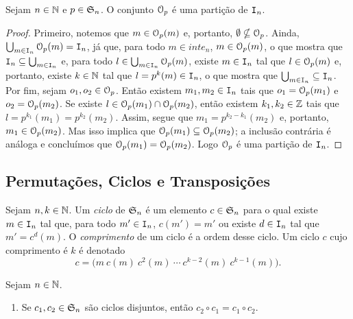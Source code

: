 \begin{prop}
	Sejam $n \in \mathbb{N}$ e $p \in \mathfrak{S}_n$. O conjunto $\mathcal{O}_p$ é uma partição de $\mathtt I_n$.
\end{prop}
\begin{proof}
	Primeiro, notemos que $m \in \mathcal{O}_p(m)$ e, portanto, $\emptyset \nsubseteq \mathcal{O}_p$. Ainda, $\bigcup_{m \in \mathtt I_n} \mathcal{O}_p(m) = \mathtt I_n$, já que, para todo $m \in inte_n$, $m \in \mathcal{O}_p(m)$, o que mostra que $\mathtt I_n \subseteq \bigcup_{m \in \mathtt I_n}$ e, para todo $l \in \bigcup_{m \in \mathtt I_n} \mathcal{O}_p(m)$, existe $m \in \mathtt I_n$ tal que $l \in \mathcal{O}_p(m)$ e, portanto, existe $k \in \mathbb{N}$ tal que $l=p^k(m) \in \mathtt I_n$, o que mostra que $\bigcup_{m \in \mathtt I_n} \subseteq \mathtt I_n$. Por fim, sejam $o_1,o_2 \in \mathcal{O}_p$. Então existem $m_1,m_2 \in \mathtt I_n$ tais que $o_1=\mathcal{O}_p(m_1)$ e $o_2=\mathcal{O}_p(m_2)$. Se existe $l \in \mathcal{O}_p(m_1) \cap \mathcal{O}_p(m_2)$, então existem $k_1,k_2 \in \mathbb{Z}$ tais que $l=p^{k_1}(m_1)=p^{k_2}(m_2)$. Assim, segue que $m_1=p^{k_2-k_1}(m_2)$ e, portanto, $m_1 \in \mathcal{O}_p(m_2)$. Mas isso implica que $\mathcal{O}_p(m_1) \subseteq \mathcal{O}_p(m_2)$; a inclusão contrária é análoga e concluímos que $\mathcal{O}_p(m_1) = \mathcal{O}_p(m_2)$. Logo $\mathcal{O}_p$ é uma partição de $\mathtt I_n$.
\end{proof}

\subsection{Permutações, Ciclos e Transposições}

\begin{defi}
	Sejam $n,k \in \mathbb{N}$. Um \emph{ciclo} de $\mathfrak{S}_n$ é um elemento $c \in \mathfrak{S}_n$ para o qual existe $m \in \mathtt I_n$ tal que, para todo $m' \in \mathtt I_n$, $c(m')=m'$ ou existe $d \in \mathtt I_n$ tal que $m'=c^d(m)$. O \emph{comprimento} de um ciclo é a ordem desse ciclo. Um ciclo $c$ cujo comprimento é $k$ é denotado
	\begin{equation*}
	c = \bigl(m \ c(m) \ c^2(m) \ \cdots \  c^{k-2}(m) \ c^{k-1}(m)\bigr).
	\end{equation*}
\end{defi}


\begin{prop}
	Sejam $n \in \mathbb{N}$.
	\begin{enumerate}
	\item Se $c_1,c_2 \in \mathfrak{S}_n$ são ciclos disjuntos, então $c_2 \circ c_1 = c_1 \circ c_2$.
	\end{enumerate}
\end{prop}

